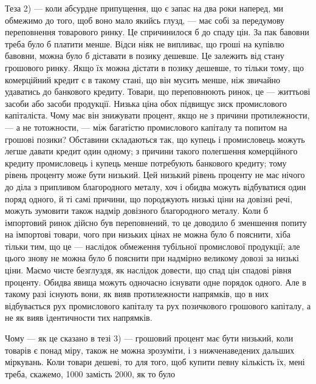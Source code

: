 Теза 2) — коли абсурдне припущення, що є запас на два роки наперед,
ми обмежимо до того, щоб воно мало якийсь глузд, — має собі за передумову
переповнення товарового ринку. Це спричинилося б до спаду цін. За пак бавовни
треба було б платити менше. Відси ніяк не випливає, що гроші на купівлю бавовни,
можна було б діставати в позику дешевше. Це залежить від стану грошового
ринку. Якщо їх можна дістати в позику дешевше, то тільки тому, що комерційний
кредит є в такому стані, що він мусить менше, ніж звичайно удаватись до
банкового кредиту. Товари, що переповнюють ринок, це — життьові засоби або засоби
продукції. Низька ціна обох підвищує зиск промислового капіталіста. Чому
має він знижувати процент, якщо не з причини протилежности, — а не тотожности,
— між багатістю промислового капіталу та попитом на грошові позики?
Обставини складаються так, що купець і промисловець можуть легше давати
кредит один одному; з причини такого полегшення комерційного кредиту промисловець
і купець менше потребують банкового кредиту; тому рівень проценту
може бути низький. Цей низький рівень проценту не має нічого до діла
з припливом благородного металу, хоч і обидва можуть відбуватися один поряд
одного, й ті самі причини, що породжують низькі ціни на довізні речі, можуть
зумовити також надмір довізного благородного металу. Коли б імпортовий ринок
дійсно був переповнений, то це доводило б зменшення попиту на імпортові
товари, чого при низьких цінах не можна було б пояснити, хіба тільки тим,
що це — наслідок обмеження тубільної промислової продукції; але цього знову
не можна було б пояснити при надмірно великому довозі за низькі ціни. Маємо
чисте безглуздя, як наслідок довести, що спад цін \deq{} спадові рівня проценту.
Обидва явища можуть одночасно існувати одне порядок одного. Але в такому
разі існують вони, як вияв протилежности напрямків, що в них відбувається рух
промислового капіталу та рух позичкового грошового капіталу, а не як вияв
ідентичности тих напрямків.

Чому — як це сказано в тезі 3) — грошовий процент має бути низький,
коли товарів є понад міру, також не можна зрозуміти, і з нижченаведених
дальших міркувань. Коли товари дешеві, то для того, щоб купити певну кількість
їх, мені треба, скажемо, 1000 замість 2000, як то було
\parbreak{}  %
